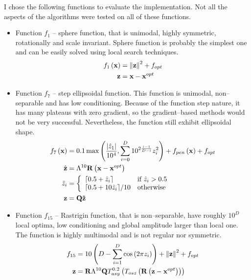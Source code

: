 I chose the following functions to evaluate the implementation. Not all the aspects of the algorithms were tested on all of these functions.
\begin{itemize}
    \item Function $f_1$ -- sphere function, that is unimodal, highly symmetric, rotationally and scale invariant. Sphere function is probably the simplest one and can be easily solved using local search techniques.
    \begin{align*}
        f_{1}\left(\mathbf{x}\right) &= \left\lVert\mathbf{z}\right\rVert^2+f_{opt} \\
        \mathbf{z} &= \mathbf{x} - \mathbf{x}^{opt}
    \end{align*}
    \item Function $f_7$ -- step ellipsoidal function. This function is unimodal, non--separable and has low conditioning. Because of the function step nature, it has many plateaus with zero gradient, so the gradient--based methods would not be very successful. Nevertheless, the function still exhibit ellipsoidal shape. 
    \begin{align*}
        f_{7}\left(\mathbf{x}\right) &= 0.1\max\left( \frac{\abs{\hat{z}_1}}{10^4}, \sum_{i=0}^D 10^{2\frac{i-1}{D-i}}z_i^2 \right) + f_{pen}\left( \mathbf{x} \right)+f_{opt} \\
        \hat{\mathbf{z}} &= \Lambda^{10}\mathbf{R} \left( \mathbf{x} - \mathbf{x}^{opt} \right) \\
        \tilde{z}_i &=\left\{ 
            \begin{array}{ll}
                \lceil 0.5 + \hat{z}_i \rceil       & \text{if}\ \hat{z}_i>0.5 \\
                \lceil 0.5 + 10\hat{z}_i\rceil / 10 & \text{otherwise}        \\
            \end{array}  
            \right. \\
        \mathbf{z} &= \mathbf{Q}\mathbf{\tilde{z}} 
    \end{align*}
    \item Function $f_{15}$ -- Rastrigin function, that is non--separable, have roughly $10^D$ local optima, low conditioning and global amplitude larger than local one. The function is highly multimodal and is not regular nor symmetric.
    \begin{align*}
        f_{15} &= 10\left( D-\sum_{i=1}^D \cos\left(2 \pi z_i\right) \right) + \norm{\mathbf{z}}^2+f_{opt} \\
        \mathbf{z} &= \mathbf{R}\Lambda^{10}\mathbf{Q}T_{asy}^{0.2} \left( T_{osz}\left(\mathbf{R}\left(\mathbf{z}-\mathbf{x}^{opt}\right)\right) \right)

\end{align*}
\end{itemize}
